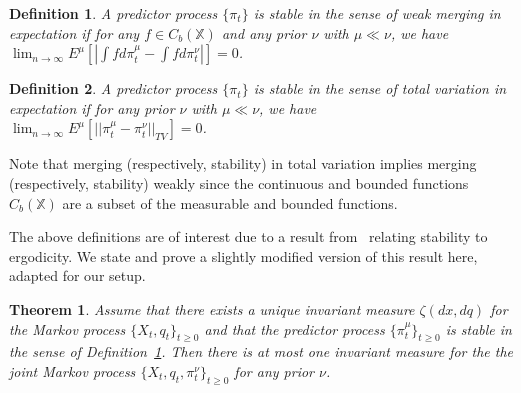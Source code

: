 \documentclass{article}
\newtheorem{theorem}{Theorem}[section]
\newtheorem{definition}{Definition}[section]
\begin{document}
\begin{definition}\label{definition:weak_stable}
    A predictor process \(\{\pi_t\}\) is stable in the sense of weak merging in expectation if for any \( f \in C_b(\mathbb{X}) \) and any prior \( \nu \) with \( \mu \ll \nu \), we have \( \lim_{n \to \infty}E^\mu [|\int fd\pi_t^\mu - \int fd\pi_t^\nu|] = 0 \).
\end{definition}

\begin{definition}\label{definition:TV_stable}
    A predictor process \(\{\pi_t\}\) is stable in the sense of total variation in expectation if for any prior \( \nu \) with \( \mu \ll \nu \), we have \( \lim_{n \to \infty}E^\mu [||\pi_t^\mu - \pi_t^\nu||_{TV}] = 0 \).
\end{definition}

Note that merging (respectively, stability) in total variation implies merging (respectively, stability) weakly since the continuous and bounded functions \( C_b(\mathbb{X}) \) are a subset of the measurable and bounded functions.

The above definitions are of interest due to a result from~\cite[Theorem 2]{Stettner} relating stability to ergodicity. We state and prove a slightly modified version of this result here, adapted for our setup.

\begin{theorem}\label{theorem:unique}
    Assume that there exists a unique invariant measure \( \zeta(dx,dq) \) for the Markov process \( \{X_t,q_t\}_{t\ge0} \) and that the predictor process \( \{\pi_t^\mu \}_{t\ge0} \) is stable in the sense of Definition~\ref{definition:weak_stable}. Then there is at most one invariant measure for the the joint Markov process \( \{X_t,q_t,\pi_t^\nu \}_{t\ge0} \) for any prior \( \nu \).
\end{theorem}
\end{document}
